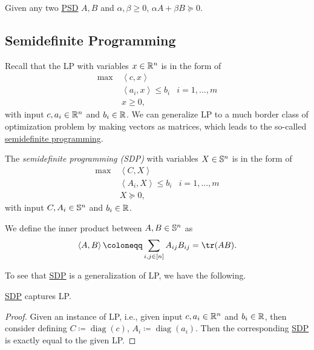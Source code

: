 \begin{remark}
	Given any two \hyperref[def:PSD]{PSD} \(A, B\) and \(\alpha , \beta \geq 0\), \(\alpha A + \beta B \succeq 0\).
\end{remark}

\subsection{Semidefinite Programming}
Recall that the LP with variables \(x\in \mathbb{\MakeUppercase{r}} ^n\) is in the form of
\[
	\begin{aligned}
		\max~ & \left\langle c, x \right\rangle                              \\
		      & \left\langle a_i, x \right\rangle \leq b_i & i=1, \ldots , m \\
		      & x \geq 0,
	\end{aligned}
\]
with input \(c, a_i\in \mathbb{\MakeUppercase{r}} ^n\) and \(b_i\in \mathbb{\MakeUppercase{r}} \). We can generalize LP to a much border class of optimization problem by making vectors as matrices, which leads to the so-called \hyperref[def:SDP]{semidefinite programming}.

\begin{definition}\label{def:SDP}
	The \emph{semidefinite programming (SDP)} with variables \(X\in \mathbb{\MakeUppercase{s}} ^n\) is in the form of
	\[
		\begin{aligned}
			\max~ & \left\langle C, X \right\rangle                              \\
			      & \left\langle A_i, X \right\rangle \leq b_i & i=1, \ldots , m \\
			      & X \succeq 0,
		\end{aligned}
	\]
	with input \(C, A_i\in \mathbb{\MakeUppercase{s}} ^n\) and \(b_i\in \mathbb{\MakeUppercase{r}} \).
\end{definition}

\begin{remark}
	We define the inner product between \(A, B\in \mathbb{\MakeUppercase{s}} ^n\) as
	\[
		\left\langle A, B \right\rangle \coloneqq \sum_{i, j\in [n]} A_{ij} B_{ij} = \tr(AB).
	\]
\end{remark}

To see that \hyperref[def:SDP]{SDP} is a generalization of LP, we have the following.

\begin{lemma}
	\hyperref[def:SDP]{SDP} captures LP.
\end{lemma}
\begin{proof}
	Given an instance of LP, i.e., given input \(c, a_i\in \mathbb{\MakeUppercase{r}} ^n\) and \(b_i\in \mathbb{\MakeUppercase{r}} \), then consider defining \(C\coloneqq \mathop{\mathrm{diag}}(c)\), \(A_i \coloneqq \mathop{\mathrm{diag}}(a_i)\). Then the corresponding \hyperref[def:SDP]{SDP} is exactly equal to the given LP.
\end{proof}


